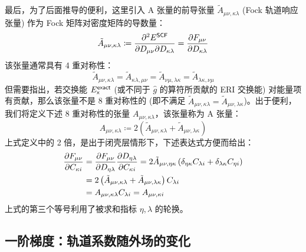 最后，为了后面推导的便利，这里引入 A 张量的前导张量 $\tilde A_{\mu \nu, \kappa \lambda}$ (Fock 轨道响应张量) 作为 Fock 矩阵对密度矩阵的导数量：
\begin{equation}
    \label{eq.3.def.Auvkl-pre}
    \tilde A_{\mu \nu, \kappa \lambda} \coloneq \frac{\partial^2 E^{\textsf{SCF}}}{\partial D_{\mu \nu} \partial D_{\kappa \lambda}} = \frac{\partial F_{\mu \nu}}{\partial D_{\kappa \lambda}}
\end{equation}
该张量通常具有 4 重对称性：
\begin{equation*}
    \tilde A_{\mu \nu, \kappa \lambda} = \tilde A_{\kappa \lambda, \mu \nu} = \tilde A_{\nu \mu, \lambda \kappa} = \tilde A_{\lambda \kappa, \nu \mu}
\end{equation*}
但需要指出，若交换能 $E_{\textsf{x}}^{\textsf{exact}}$ (或不同于 $\hat g$ 的算符所贡献的 ERI 交换能) 对能量项有贡献，那么该张量不是 8 重对称性的 (即不满足 $\tilde A_{\mu \nu, \kappa \lambda} = \tilde A_{\mu \nu, \lambda \kappa}$)。出于便利，我们将定义下述 8 重对称性的张量 $A_{\mu \nu, \kappa \lambda}$，该张量称为 A 张量：
\begin{equation}
    \label{eq.3.def.Auvkl}
    A_{\mu \nu, \kappa \lambda} \coloneq 2 \left( \tilde A_{\mu \nu, \kappa \lambda} + \tilde A_{\mu \nu, \lambda \kappa} \right)
\end{equation}
上式定义中的 2 倍，是出于闭壳层情形下，下述表达式方便而给出：
\begin{align}
    \frac{\partial F_{\mu \nu}}{\partial C_{\kappa i}} &= \frac{\partial F_{\mu \nu}}{\partial D_{\eta \lambda}} \frac{\partial D_{\eta \lambda}}{\partial C_{\kappa i}}
    = 2 \tilde A_{\mu \nu, \eta \kappa} \left( \delta_{\eta \kappa} C_{\lambda i} + \delta_{\lambda \kappa} C_{\eta i} \right) \notag\\
    &= 2 \left( \tilde A_{\mu \nu, \kappa \lambda} + \tilde A_{\mu \nu, \lambda \kappa} \right) C_{\lambda i} \notag\\
    &= A_{\mu \nu, \kappa \lambda} C_{\lambda i} = A_{\mu \nu, \kappa i}
\end{align}
上式的第三个等号利用了被求和指标 $\eta, \lambda$ 的轮换。

\subsection{一阶梯度：轨道系数随外场的变化}

